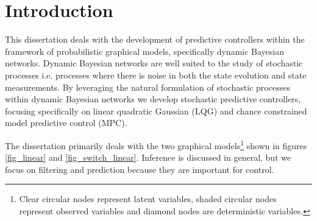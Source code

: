 \chapter{Introduction}
This dissertation deals with the development of predictive controllers within the framework of probabilistic graphical models, specifically dynamic Bayesian networks. Dynamic Bayesian networks are well suited to the study of stochastic processes i.e. processes where there is noise in both the state evolution and state measurements. By leveraging the natural formulation of stochastic processes within dynamic Bayesian networks we develop stochastic predictive controllers, focusing specifically on linear quadratic Gaussian (LQG) and chance constrained model predictive control (MPC).

The dissertation primarily deals with the two graphical models\footnote{Clear circular nodes represent latent variables, shaded circular nodes represent observed variables and diamond nodes are deterministic variables.} shown in figures \ref{fig_linear} and \ref{fig_switch_linear}. Inference is discussed in general, but we focus on filtering and prediction because they are important for control. 
